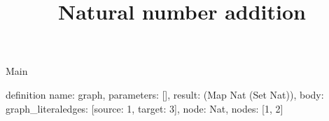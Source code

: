\begin{lexlean}{Main}
\title{Natural number addition}
\begin{semanticmodule}
definition{
  name: graph,
  parameters: [],
  result: (Map Nat (Set Nat)),
  body: graph_literal{edges: [{source: 1, target: 3}], node: Nat, nodes: [1, 2]}
}
\end{semanticmodule}
\end{lexlean}
